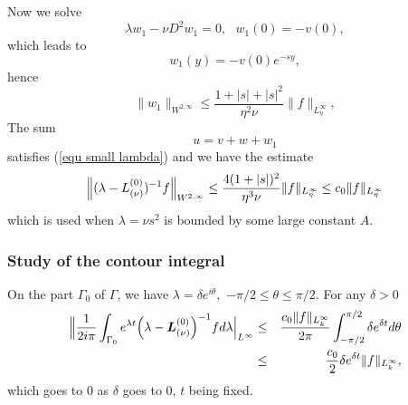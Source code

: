 \documentclass[11pt]{article}
\begin{document}
Now we solve%
\begin{equation*}
\lambda w_{1}-\nu D^{2}w_{1}=0,\text{ }w_{1}(0)=-v(0),
\end{equation*}%
which leads to%
\begin{equation*}
w_{1}(y)=-v(0)e^{-sy},
\end{equation*}%
hence%
\begin{equation*}
\|w_{1}\|_{W^{2,\infty }}\leq \frac{1+|s|+|s|^{2}}{\eta ^{2}\nu }%
\|f\|_{L_{\eta }^{\infty }},
\end{equation*}%
The sum%
\begin{equation*}
u=v+w+w_{1}
\end{equation*}%
satisfies (\ref{equ small lambda}) and we have the estimate%
\begin{equation}
\Bigl\| (\lambda -L_{(\nu )}^{(0)})^{-1}f \Bigr\|_{W^{2,\infty }}\leq \frac{4(1+|s|)^{2}%
}{\eta ^{3}\nu }\|f\|_{L_{\eta }^{\infty }}\leq c_{0}\|f\|_{L_{\eta }^{\infty }}
\label{estim resol nighb 0}
\end{equation}%
which is used when $\lambda =\nu s^{2}$ is bounded by some large constant $A$.



\subsubsection{Study of the contour integral}




On the part $\Gamma _{0}$ of $\Gamma$, we have $\lambda =\delta e^{i\theta
}, $ $-\pi /2\leq \theta \leq \pi /2.$ For any $\delta >0$%
\begin{eqnarray*}
\Bigl\|\frac{1}{2i\pi }\int_{\Gamma _{0}}e^{\lambda t} \Bigl(\lambda -\boldsymbol{L}%
_{(\nu )}^{(0)} \Bigr)^{-1}f d\lambda  \Bigr|_{L^{\infty }} &\leq &\frac{%
c_{0}\|f\|_{L_{k}^{\infty }}}{2\pi }\int_{-\pi /2}^{\pi /2}\delta e^{\delta
t}d\theta \\
&\leq &\frac{c_{0}}{2}\delta e^{\delta t}\|f\|_{L_{k}^{\infty }},
\end{eqnarray*}
which goes to $0$ as $\delta$ goes to $0$, $t$ being fixed.
\end{document}
